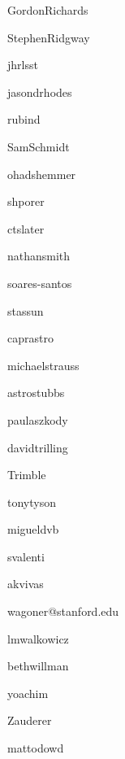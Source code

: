 \author{Gordon Richards}{GordonRichards}{\drexel}
\author{Stephen Ridgway}{StephenRidgway}{\noao}
\author{Jeonghee Rho}{jhrlsst}{\seti}
\author{Jason Rhodes}{jasondrhodes}{\jpl}
\author{David Rubin}{rubind}{\stsci}
\author{Samuel Schmidt}{SamSchmidt}{\ucd}
\author{Ohad Shemmer}{ohadshemmer}{\unt}
\author{Avi Shporer}{shporer}{\jpl}
\author{Colin Slater}{ctslater}{\uw}
\author{Nathan Smith}{nathansmith}{\arizona}
\author{Marcelles Soares-Santos}{soares-santos}{\somewhere}
\author{Keivan Stassun}{stassun}{\vanderbilt}
\author{Jay Strader}{caprastro}{\msu}
\author{Michael Strauss}{michaelstrauss}{\princeton}
\author{Rachel Street}{}{\lcogt}
\author{Christopher Stubbs}{astrostubbs}{\somewhere}
\author{Paula Szkody}{paulaszkody}{\uw}
\author{David Trilling}{davidtrilling}{\somewhere}
\author{Virginia Trimble}{Trimble}{\somewhere}
\author{Tony Tyson}{tonytyson}{\ucd}
\author{Miguel de Val-Borro}{migueldvb}{\princeton}
\author{Stefano Valenti}{svalenti}{\somewhere}
\author{Kathy Vivas}{akvivas}{\ctio}
\author{Robert Wagoner}{wagoner@stanford.edu}{\stanford}
\author{Lucianne Walkowicz}{lmwalkowicz}{\adler}
\author{Beth Willman}{bethwillman}{\lsst}
\author{Peter Yoachim}{yoachim}{\somewhere}
\author{Bevin Ashley Zauderer}{Zauderer}{\nyu}
\author{Matt O'Dowd}{mattodowd}{\cuny}
